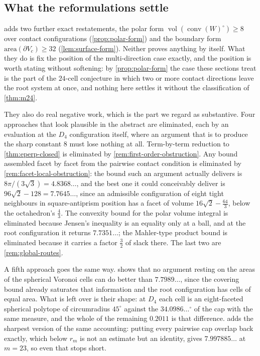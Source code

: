 \documentclass[11pt,reqno]{amsart}
\renewcommand{\_}{\origunderscore\allowbreak}
\numberwithin{equation}{section}
\theoremstyle{plain}
\theoremstyle{definition}
\theoremstyle{remark}
\DeclareMathOperator{\vol}{vol}
\DeclareMathOperator{\conv}{conv}
\begin{document}
\subsection{What the reformulations settle}

 adds two further exact restatements, the polar
form $\vol(\conv(W)^{\circ})\ge8$ over contact configurations
(\cref{prop:polar-form}) and the boundary form
$\mathrm{area}(\partial V_c)\ge32$ (\cref{lem:surface-form}). Neither
proves anything by itself. What they do is fix the position of the
multi-direction case exactly, and the position is worth stating without
softening: by \cref{prop:polar-form} the case these sections treat is
the part of the $24$-cell conjecture in which two or more contact
directions leave the root system at once, and nothing here settles it
without the classification of \cref{thm:m24}.

They also do real negative work, which is the part we regard as
substantive. Four approaches that look plausible in the abstract are
eliminated, each by an evaluation at the $D_4$ configuration itself,
where an argument that is to produce the sharp constant $8$ must lose
nothing at all. Term-by-term reduction to \cref{thm:eperp-closed} is
eliminated by \cref{rem:first-order-obstruction}. Any bound assembled
facet by facet from the pairwise contact condition is eliminated by
\cref{rem:facet-local-obstruction}: the bound such an argument actually
delivers is $8\pi/(3\sqrt3)=4.8368\ldots$, and the best one it could
conceivably deliver is $96\sqrt2-128=7.7645\ldots$, since an admissible
configuration of eight tight neighbours in square-antiprism position has
a facet of volume $16\sqrt2-\tfrac{64}3$, below the octahedron's
$\tfrac43$. The convexity bound for the polar volume integral is
eliminated because Jensen's inequality is an equality only at a ball,
and at the root configuration it returns $7.7351\ldots$; the Mahler-type
product bound is eliminated because it carries a factor $\tfrac32$ of
slack there. The last two are \cref{rem:global-routes}.

A fifth approach goes the same way.  shows
that no argument resting on the areas of the spherical Voronoi cells can
do better than $7.7989\ldots$, since the covering bound already
saturates that information and the root configuration has cells of equal
area. What is left over is their shape: at $D_4$ each cell is an
eight-faceted spherical polytope of circumradius $45^\circ$ against the
$34.0986\ldots^\circ$ of the cap with the same measure, and the whole of
the remaining $0.2011$ is that difference.  adds
the sharpest version of the same accounting: putting every pairwise cap
overlap back exactly, which below $r_m$ is not an estimate but an
identity, gives $7.997885\ldots$ at $m=23$, so even that stops short.
\end{document}
